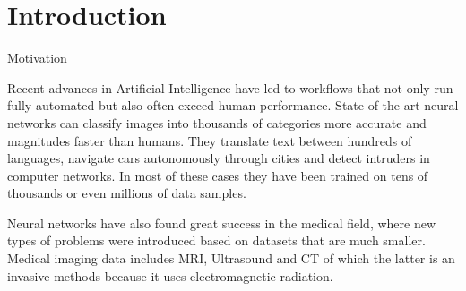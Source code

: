 \section{Introduction}

Motivation

Recent advances in Artificial Intelligence have led to workflows that not only run fully automated but also often exceed human performance. State of the art neural networks can classify images into thousands of categories more accurate and magnitudes faster than humans. They translate text between hundreds of languages, navigate cars autonomously through cities and detect intruders in computer networks. In most of these cases they have been trained on tens of thousands or even millions of data samples.

Neural networks have also found great success in the medical field, where new types of problems were introduced based on datasets that are much smaller. Medical imaging data includes MRI, Ultrasound and CT of which the latter is an invasive methods because it uses electromagnetic radiation.

\newpage
